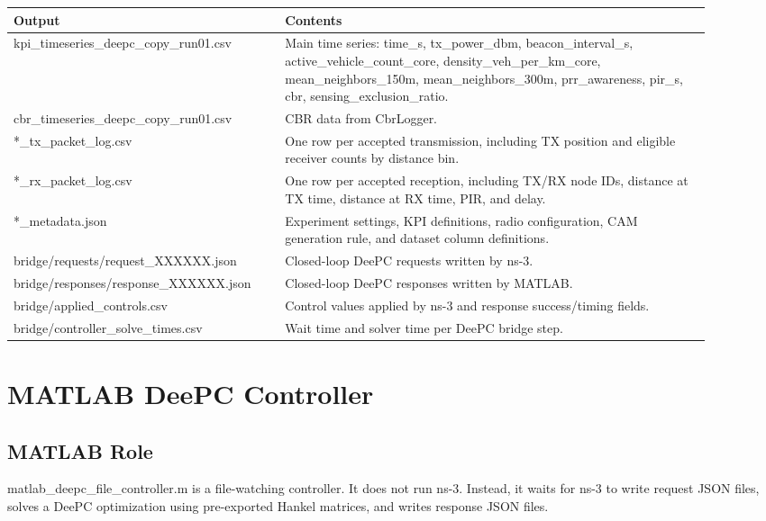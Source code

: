 \documentclass[11pt]{article}
\DeclareRobustCommand{\code}[1]{\texttt{\detokenize{#1}}}
\def\code#1{#1}%
\begin{document}
\begin{center}
\begin{longtable}{L{0.34\linewidth}L{0.56\linewidth}}
\toprule
Output & Contents \\
\midrule
\endhead
\code{kpi_timeseries_deepc_copy_run01.csv} &
Main time series:
\code{time_s}, \code{tx_power_dbm}, \code{beacon_interval_s},
\code{active_vehicle_count_core}, \code{density_veh_per_km_core},
\code{mean_neighbors_150m}, \code{mean_neighbors_300m},
\code{prr_awareness}, \code{pir_s}, \code{cbr},
\code{sensing_exclusion_ratio}. \\
\code{cbr_timeseries_deepc_copy_run01.csv} &
CBR data from \code{CbrLogger}. \\
\code{*_tx_packet_log.csv} &
One row per accepted transmission, including TX position and eligible receiver
counts by distance bin. \\
\code{*_rx_packet_log.csv} &
One row per accepted reception, including TX/RX node IDs, distance at TX time,
distance at RX time, PIR, and delay. \\
\code{*_metadata.json} &
Experiment settings, KPI definitions, radio configuration, CAM generation rule,
and dataset column definitions. \\
\code{bridge/requests/request_XXXXXX.json} &
Closed-loop DeePC requests written by ns-3. \\
\code{bridge/responses/response_XXXXXX.json} &
Closed-loop DeePC responses written by MATLAB. \\
\code{bridge/applied_controls.csv} &
Control values applied by ns-3 and response success/timing fields. \\
\code{bridge/controller_solve_times.csv} &
Wait time and solver time per DeePC bridge step. \\
\bottomrule
\end{longtable}
\end{center}

\section{MATLAB DeePC Controller}

\subsection{MATLAB Role}

\code{matlab_deepc_file_controller.m} is a file-watching controller.  It does not
run ns-3.  Instead, it waits for ns-3 to write request JSON files, solves a DeePC
optimization using pre-exported Hankel matrices, and writes response JSON files.
\end{document}
